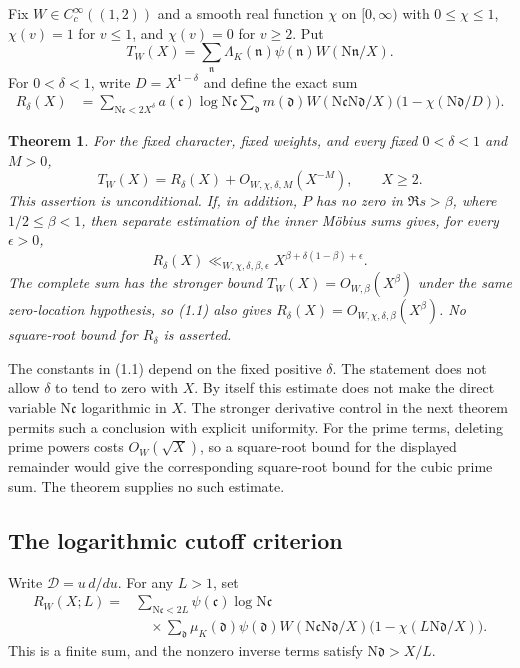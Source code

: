 \documentclass[11pt]{article}
\newtheorem{theorem}{Theorem}[section]
\newcommand{\N}{\mathrm N}
\begin{document}
Fix $W\in C_c^\infty((1,2))$ and a smooth real function $\chi$ on
$[0,\infty)$ with $0\le\chi\le1$, $\chi(v)=1$ for $v\le1$,
and $\chi(v)=0$ for $v\ge2$. Put
\[
 T_W(X)=\sum_{\mathfrak n}
       \Lambda_K(\mathfrak n)\psi(\mathfrak n)W(\N\mathfrak n/X).
\]
For $0<\delta<1$, write $D=X^{1-\delta}$ and define the exact sum
\begin{align}
 R_\delta(X)
 &=\sum_{\N\mathfrak c<2X^\delta}
       a(\mathfrak c)\log\N\mathfrak c
       \sum_{\mathfrak d}m(\mathfrak d)
       W(\N\mathfrak c\N\mathfrak d/X)
       \bigl(1-\chi(\N\mathfrak d/D)\bigr).
                                                        \label{eq:remainder}
\end{align}

\begin{theorem}\label{thm:switch}
For the fixed character, fixed weights, and every fixed
$0<\delta<1$ and $M>0$,
\[
 T_W(X)=R_\delta(X)+O_{W,\chi,\delta,M}(X^{-M}),
       \qquad X\ge2.                                      \tag{1.1}
\]
This assertion is unconditional. If, in addition, $P$ has no zero
in $\Re s>\beta$, where $1/2\le\beta<1$, then separate estimation
of the inner M\"obius sums gives, for every $\epsilon>0$,
\[
 R_\delta(X)\ll_{W,\chi,\delta,\beta,\epsilon}
 X^{\beta+\delta(1-\beta)+\epsilon}.                        \tag{1.2}
\]
The complete sum has the stronger bound
$T_W(X)=O_{W,\beta}(X^\beta)$ under the same zero-location
hypothesis, so (1.1) also gives $R_\delta(X)=O_{W,\chi,\delta,\beta}(X^\beta)$.
No square-root bound for $R_\delta$ is asserted.
\end{theorem}

The constants in (1.1) depend on the fixed positive $\delta$.
The statement does not allow $\delta$ to tend to zero with $X$.
By itself this estimate does not make the direct variable
$\N\mathfrak c$ logarithmic in $X$. The stronger derivative control
in the next theorem permits such a conclusion with explicit uniformity.
For the prime terms, deleting prime powers costs $O_W(\sqrt X)$,
so a square-root bound for the displayed remainder would give
the corresponding square-root bound for the cubic prime sum.
The theorem supplies no such estimate.

\subsection{The logarithmic cutoff criterion}
Write $\mathcal D=u\,d/du$. For any $L>1$, set
\begin{align*}
 R_W(X;L)={}&\sum_{\N\mathfrak c<2L}
     \psi(\mathfrak c)\log\N\mathfrak c\\
 &\quad\times\sum_{\mathfrak d}\mu_K(\mathfrak d)\psi(\mathfrak d)
 W(\N\mathfrak c\N\mathfrak d/X)
 \bigl(1-\chi(L\N\mathfrak d/X)\bigr).
\end{align*}
This is a finite sum, and the nonzero inverse terms satisfy
$\N\mathfrak d>X/L$.
\end{document}
